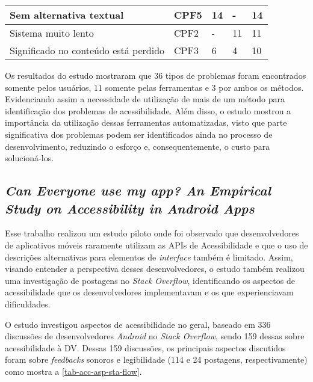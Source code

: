 \begin{table}[htb]
\begin{center}
\begin{tabular}{p{10.5cm}|p{1.4cm}|p{0.6cm}|p{0.6cm}|p{0.7cm}}
      \hline
      Sem alternativa textual                                                 & CPF5               & 14           & -            & 14             \\
      \hline
      Sistema muito lento                                                     & CPF2               & -            & 11           & 11             \\
      \hline
      Significado no conteúdo está perdido                                    & CPF3               & 6            & 4            & 10             \\
    \end{tabular}
  \end{center}
\end{table}

Os resultados do estudo mostraram que 36 tipos de problemas foram encontrados somente pelos usuários, 11 somente pelas ferramentas e 3 por ambos os métodos.
Evidenciando assim a necessidade de utilização de mais de um método para identificação dos problemas de acessibilidade.
Além disso, o estudo mostrou a importância da utilização dessas ferramentas automatizadas, visto que parte significativa dos problemas podem ser identificados ainda no processo de desenvolvimento, reduzindo o esforço e, consequentemente, o custo para solucioná-los.

\subsection{\emph{Can Everyone use my app? An Empirical Study on Accessibility in Android Apps}}

Esse trabalho realizou um estudo piloto onde foi observado que desenvolvedores de aplicativos móveis raramente utilizam as APIs de Acessibilidade e que o uso de descrições alternativas para elementos de \emph{interface} também é limitado.
Assim, visando entender a perspectiva desses desenvolvedores, o estudo também realizou uma investigação de postagens no \emph{Stack Overflow}, identificando os aspectos de acessibilidade que os desenvolvedores implementavam e os que experienciavam dificuldades.

O estudo investigou aspectos de acessibilidade no geral, baseado em 336 discussões de desenvolvedores \emph{Android} no \emph{Stack Overflow}, sendo 159 dessas sobre acessibilidade à DV\@.
Dessas 159 discussões, os principais aspectos discutidos foram sobre \emph{feedbacks} sonoros e legibilidade (114 e 24 postagens, respectivamente) como mostra a \autoref{tab-acc-asp-sta-flow}.

